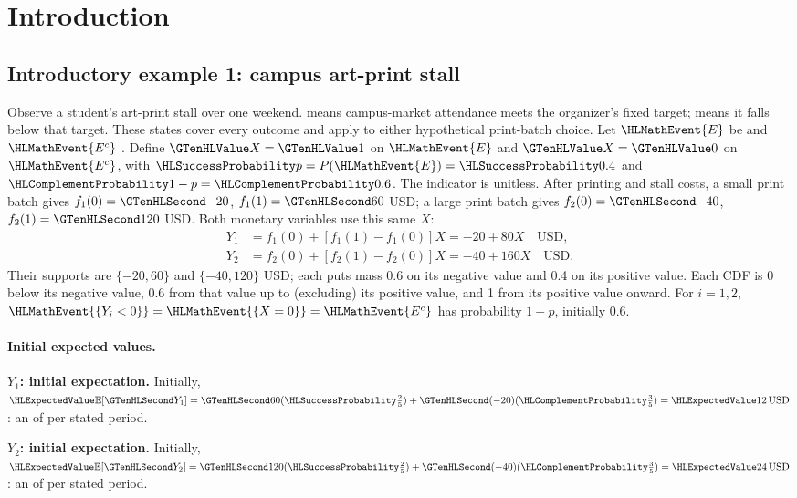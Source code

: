\section{Introduction}\label{sec:t2-c3-introduction}
\subsection{Introductory example 1: campus art-print stall}\label{ex:intro-one}
Observe a student's art-print stall over one weekend.  means campus-market
attendance meets the organizer's fixed target;  means it falls below that target.
These states cover every outcome and apply to either hypothetical print-batch choice.
Let $\HLMathEvent{E}$ be  and
$\HLMathEvent{E^c}$ . Define $\Indicator{X}=\Indicator{1}$ on $\HLMathEvent{E}$ and
$\Indicator{X}=\Indicator{0}$ on $\HLMathEvent{E^c}$, with $\SuccessProb{p}=P(\HLMathEvent{E})=\SuccessProb{0.4}$
and $\FailureProb{1-p}=\FailureProb{0.6}$. The indicator is unitless.
After printing and stall costs, a small print batch gives $f_1(0)=\Money{-20}$, $f_1(1)=\Money{60}$ USD;
a large print batch gives $f_2(0)=\Money{-40}$, $f_2(1)=\Money{120}$ USD.
Both monetary variables use this same $X$:
\[
\begin{aligned}
Y_1&=f_1(0)+[f_1(1)-f_1(0)]X=-20+80X\quad\text{USD},\\
Y_2&=f_2(0)+[f_2(1)-f_2(0)]X=-40+160X\quad\text{USD}.
\end{aligned}
\]
Their supports are $\{-20,60\}$ and $\{-40,120\}$ USD; each puts mass 0.6
on its negative value and 0.4 on its positive value. Each CDF is 0 below its
negative value, 0.6 from that value up to (excluding) its positive value,
and 1 from its positive value onward.
For $i=1,2$, $\HLMathEvent{\{Y_i<0\}}=\HLMathEvent{\{X=0\}}=\HLMathEvent{E^c}$ has probability $1-p$, initially 0.6.
\paragraph{Initial expected values.}
\textbf{$Y_1$: initial expectation.}
Initially, $\ExpectedValue{\mathbb E}[\Money{Y_1}]=\Money{60}(\SuccessProb{\frac{2}{5}})+\Money{(-20)}(\FailureProb{\frac{3}{5}})=\ExpectedValue{12\,\text{USD}}$:
an  of  per stated period.

\textbf{$Y_2$: initial expectation.}
Initially, $\ExpectedValue{\mathbb E}[\Money{Y_2}]=\Money{120}(\SuccessProb{\frac{2}{5}})+\Money{(-40)}(\FailureProb{\frac{3}{5}})=\ExpectedValue{24\,\text{USD}}$:
an  of  per stated period.
